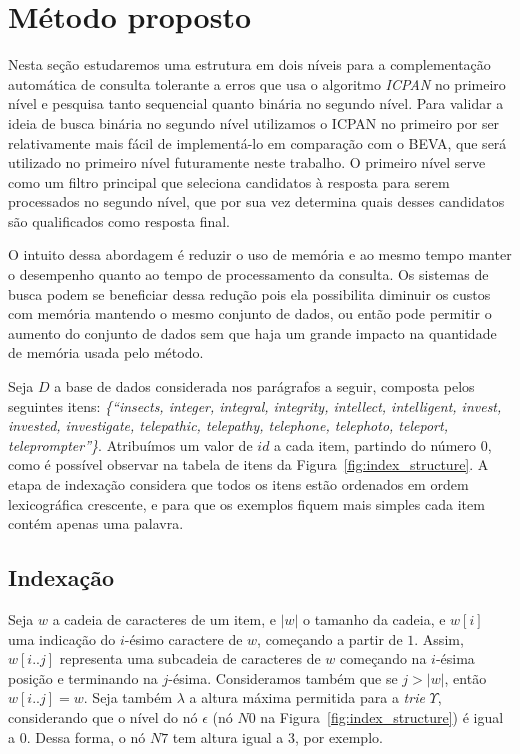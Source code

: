 \section{Método proposto} \label{sec:metodo}

Nesta seção estudaremos uma estrutura em dois níveis para a complementação automática de consulta tolerante a erros que usa o algoritmo \textit{ICPAN} no primeiro nível e pesquisa tanto sequencial quanto binária no segundo nível. Para validar a ideia de busca binária no segundo nível utilizamos o ICPAN no primeiro por ser relativamente mais fácil de implementá-lo em comparação com o BEVA, que será utilizado no primeiro nível futuramente neste trabalho. O primeiro nível serve como um filtro principal que seleciona candidatos à resposta para serem processados no segundo nível, que por sua vez determina quais desses candidatos são qualificados como resposta final.

O intuito dessa abordagem é reduzir o uso de memória e ao mesmo tempo manter o desempenho quanto ao tempo de processamento da consulta. Os sistemas de busca podem se beneficiar dessa redução pois ela possibilita diminuir os custos com memória mantendo o mesmo conjunto de dados, ou então pode permitir o aumento do conjunto de dados sem que haja um grande impacto na quantidade de memória usada pelo método.

Seja $D$ a base de dados considerada nos parágrafos a seguir, composta pelos seguintes itens: \textit{\{``insects, integer, integral, integrity, intellect, intelligent, invest, invested, investigate, telepathic, telepathy, telephone, telephoto, teleport, teleprompter''\}}. Atribuímos um valor de $id$ a cada item, partindo do número $0$, como é possível observar na tabela de itens da Figura~\ref{fig:index_structure}. A etapa de indexação considera que todos os itens estão ordenados em ordem lexicográfica crescente, e para que os exemplos fiquem mais simples cada item contém apenas uma palavra.
 
\subsection{Indexação} 
\label{sec:indexing}
Seja $w$ a cadeia de caracteres de um item, e $|w|$ o tamanho da cadeia, e $w[i]$ uma indicação do $i$-ésimo caractere de $w$, começando a partir de $1$. Assim, $w[i..j]$ representa uma subcadeia de caracteres de $w$ começando na $i$-ésima posição e terminando na $j$-ésima. Consideramos também que se $j > |w|$, então $w[i..j] = w$. Seja também $\lambda$ a altura máxima permitida para a \textit{trie} $\Upsilon$, considerando que o nível do nó $\epsilon$ (nó $N0$ na Figura~\ref{fig:index_structure}) é igual a $0$. Dessa forma, o nó $N7$ tem altura igual a $3$, por exemplo. 


